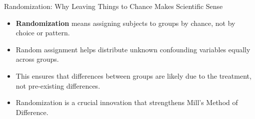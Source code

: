 \documentclass{beamer}
\begin{document}
\begin{frame}{Randomization: Why Leaving Things to Chance Makes Scientific Sense}
    \begin{itemize}
        \item \textbf{Randomization} means assigning subjects to groups by chance, not by choice or pattern.
        \item Random assignment helps distribute unknown confounding variables equally across groups.
        \item This ensures that differences between groups are likely due to the treatment, not pre-existing differences.
        \item Randomization is a crucial innovation that strengthens Mill's Method of Difference.
    \end{itemize}
    
    \begin{center}
    \end{center}
\end{frame}
\end{document}

